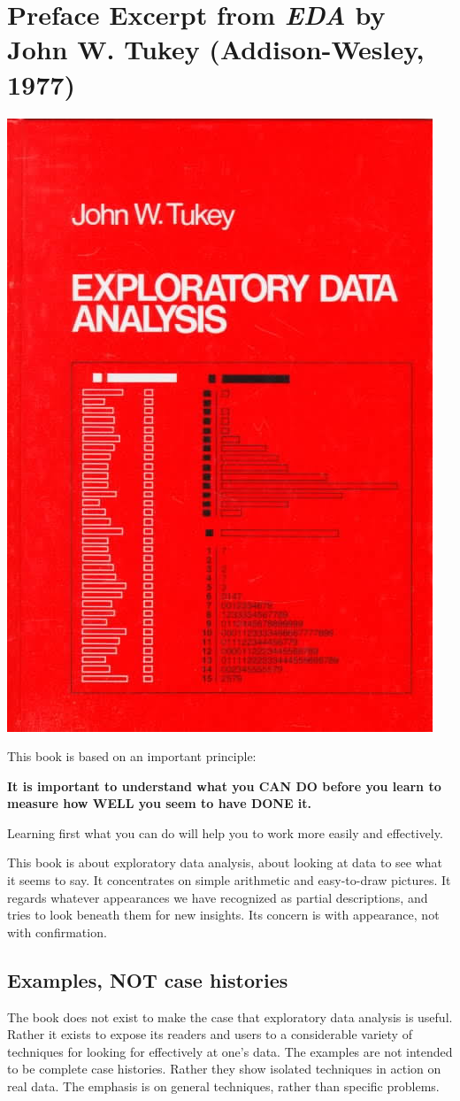 \documentclass[
]{book}
\begin{document}
\hypertarget{preface-excerpt-from-eda-by-john-w.-tukey-addison-wesley-1977}{%
\section{\texorpdfstring{Preface Excerpt from \emph{EDA} by John W. Tukey (Addison-Wesley, 1977)}{Preface Excerpt from EDA by John W. Tukey (Addison-Wesley, 1977)}}\label{preface-excerpt-from-eda-by-john-w.-tukey-addison-wesley-1977}}

\includegraphics[width=0.4\linewidth]{figures/introduction/tukeyeda}

This book is based on an important principle:

\textbf{It is important to understand what you CAN DO before you learn to measure how WELL you seem to have DONE it.}

Learning first what you can do will help you to work more easily and effectively.

This book is about exploratory data analysis, about looking at data to see what it seems to say. It concentrates on simple arithmetic and easy-to-draw pictures. It regards whatever appearances we have recognized as partial descriptions, and tries to look beneath them for new insights. Its concern is with appearance, not with confirmation.

\hypertarget{examples-not-case-histories}{%
\subsection{Examples, NOT case histories}\label{examples-not-case-histories}}

The book does not exist to make the case that exploratory data analysis is useful. Rather it exists to expose its readers and users to a considerable variety of techniques for looking for effectively at one's data. The examples are not intended to be complete case histories. Rather they show isolated techniques in action on real data. The emphasis is on general techniques, rather than specific problems.
\end{document}
